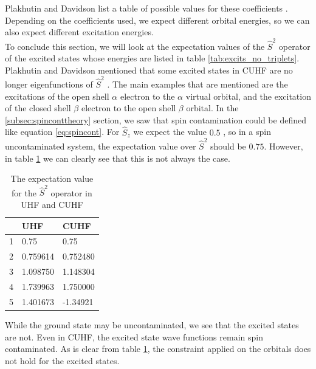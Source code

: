 Plakhutin and Davidson list a table of possible values for these coefficients \cite{Plakhutin2014}. Depending on the coefficients used, we expect different orbital energies, so we can also
expect different excitation energies. \\
To conclude this section, we will look at the expectation values of the $\hat{S}^2$ operator of the excited states whose energies are listed in table \ref{tab:excits_no_triplets}.
Plakhutin and Davidson mentioned that some excited states in CUHF are no longer eigenfunctions of $\hat{S}^2$ \cite{Plakhutin2014}. The main examples that are mentioned are the
excitations of the open shell $\alpha$ electron to the $\alpha$ virtual orbital, and the excitation of the closed shell $\beta$ electron to the open shell $\beta$ orbital. In the
\ref{subsec:spinconttheory} section, we saw that spin contamination could be defined like equation \eqref{eq:spincont}. For $\hat{S}_z$ we expect the value $0.5$ \cite{Acke2019}, so in a
spin uncontaminated system, the expectation value over $\hat{S}^2$ should be $0.75$. However, in table \ref{tab:spincon} we can clearly see that this is not always the case.

\begin{table}[H]
  \caption{The expectation value for the $\hat{S}^2$ operator in UHF and CUHF}
  \label{tab:spincon}
  \begin{tabular}{l|l|l}
      & UHF      & CUHF     \\
    \hline
    1 & 0.75     & 0.75     \\
    2 & 0.759614 & 0.752480 \\
    3 & 1.098750 & 1.148304 \\
    4 & 1.739963 & 1.750000 \\
    5 & 1.401673 & -1.34921
  \end{tabular}
\end{table}
While the ground state may be uncontaminated, we see that the excited states are not. Even in CUHF, the excited state wave functions remain spin contaminated. As is clear from table
\ref{tab:spincon}, the constraint applied on the orbitals does not hold for the excited states.
